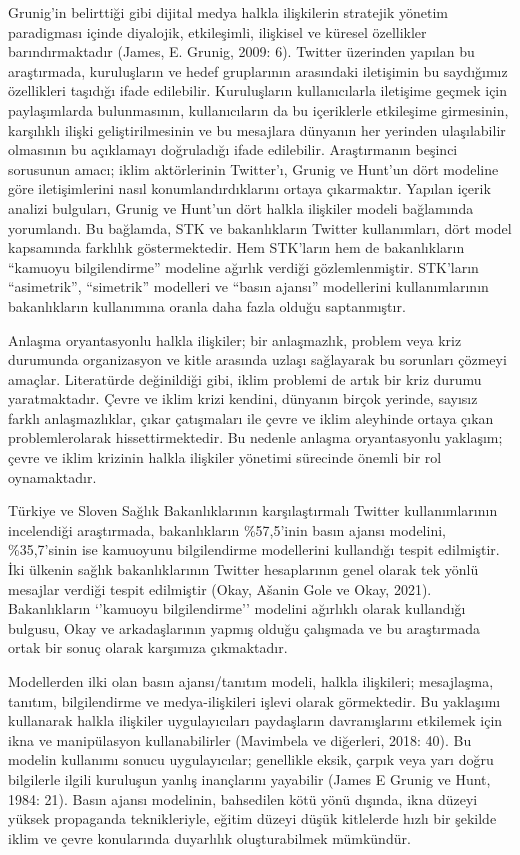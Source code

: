 \documentclass[
]{book}
\begin{document}
Grunig'in belirttiği gibi dijital medya halkla ilişkilerin stratejik yönetim paradigması içinde diyalojik, etkileşimli, ilişkisel ve küresel özellikler barındırmaktadır (James, E. Grunig, 2009: 6). Twitter üzerinden yapılan bu araştırmada, kuruluşların ve hedef gruplarının arasındaki iletişimin bu saydığımız özellikleri taşıdığı ifade edilebilir. Kuruluşların kullanıcılarla iletişime geçmek için paylaşımlarda bulunmasının, kullanıcıların da bu içeriklerle etkileşime girmesinin, karşılıklı ilişki geliştirilmesinin ve bu mesajlara dünyanın her yerinden ulaşılabilir olmasının bu açıklamayı doğruladığı ifade edilebilir.
Araştırmanın beşinci sorusunun amacı; iklim aktörlerinin Twitter'ı, Grunig ve Hunt'un dört modeline göre iletişimlerini nasıl konumlandırdıklarını ortaya çıkarmaktır. Yapılan içerik analizi bulguları, Grunig ve Hunt'un dört halkla ilişkiler modeli bağlamında yorumlandı. Bu bağlamda, STK ve bakanlıkların Twitter kullanımları, dört model kapsamında farklılık göstermektedir. Hem STK'ların hem de bakanlıkların ``kamuoyu bilgilendirme'' modeline ağırlık verdiği gözlemlenmiştir. STK'ların ``asimetrik'', ``simetrik'' modelleri ve ``basın ajansı'' modellerini kullanımlarının bakanlıkların kullanımına oranla daha fazla olduğu saptanmıştır.

Anlaşma oryantasyonlu halkla ilişkiler; bir anlaşmazlık, problem veya kriz durumunda organizasyon ve kitle arasında uzlaşı sağlayarak bu sorunları çözmeyi amaçlar. Literatürde değinildiği gibi, iklim problemi de artık bir kriz durumu yaratmaktadır. Çevre ve iklim krizi kendini, dünyanın birçok yerinde, sayısız farklı anlaşmazlıklar, çıkar çatışmaları ile çevre ve iklim aleyhinde ortaya çıkan problemlerolarak hissettirmektedir. Bu nedenle anlaşma oryantasyonlu yaklaşım; çevre ve iklim krizinin halkla ilişkiler yönetimi sürecinde önemli bir rol oynamaktadır.

Türkiye ve Sloven Sağlık Bakanlıklarının karşılaştırmalı Twitter kullanımlarının incelendiği araştırmada, bakanlıkların \%57,5'inin basın ajansı modelini, \%35,7'sinin ise kamuoyunu bilgilendirme modellerini kullandığı tespit edilmiştir. İki ülkenin sağlık bakanlıklarının Twitter hesaplarının genel olarak tek yönlü mesajlar verdiği tespit edilmiştir (Okay, Ašanin Gole ve Okay, 2021). Bakanlıkların `'kamuoyu bilgilendirme'' modelini ağırlıklı olarak kullandığı bulgusu, Okay ve arkadaşlarının yapmış olduğu çalışmada ve bu araştırmada ortak bir sonuç olarak karşımıza çıkmaktadır.

Modellerden ilki olan basın ajansı/tanıtım modeli, halkla ilişkileri; mesajlaşma, tanıtım, bilgilendirme ve medya-ilişkileri işlevi olarak görmektedir. Bu yaklaşımı kullanarak halkla ilişkiler uygulayıcıları paydaşların davranışlarını etkilemek için ikna ve manipülasyon kullanabilirler (Mavimbela ve diğerleri, 2018: 40). Bu modelin kullanımı sonucu uygulayıcılar; genellikle eksik, çarpık veya yarı doğru bilgilerle ilgili kuruluşun yanlış inançlarını yayabilir (James E Grunig ve Hunt, 1984: 21). Basın ajansı modelinin, bahsedilen kötü yönü dışında, ikna düzeyi yüksek propaganda teknikleriyle, eğitim düzeyi düşük kitlelerde hızlı bir şekilde iklim ve çevre konularında duyarlılık oluşturabilmek mümkündür.
\end{document}
